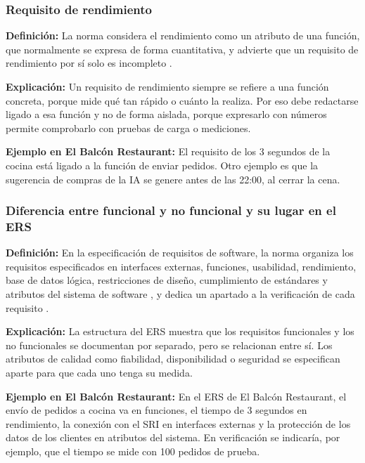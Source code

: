 \subsubsection{Requisito de rendimiento}

\textbf{Definición:} La norma considera el rendimiento como un atributo de una función, que normalmente se expresa de forma cuantitativa, y advierte que un requisito de rendimiento por sí solo es incompleto \cite[\nopp cl.~5.2.8.3]{ieee29148}.

\textbf{Explicación:} Un requisito de rendimiento siempre se refiere a una función concreta, porque mide qué tan rápido o cuánto la realiza. Por eso debe redactarse ligado a esa función y no de forma aislada, porque expresarlo con números permite comprobarlo con pruebas de carga o mediciones.

\textbf{Ejemplo en El Balcón Restaurant:} El requisito de los 3 segundos de la cocina está ligado a la función de enviar pedidos. Otro ejemplo es que la sugerencia de compras de la IA se genere antes de las 22:00, al cerrar la cena.

\subsubsection{Diferencia entre funcional y no funcional y su lugar en el ERS}

\textbf{Definición:} En la especificación de requisitos de software, la norma organiza los requisitos especificados en interfaces externas, funciones, usabilidad, rendimiento, base de datos lógica, restricciones de diseño, cumplimiento de estándares y atributos del sistema de software \cite[\nopp cl.~9.6.10–9.6.18]{ieee29148}, y dedica un apartado a la verificación de cada requisito \cite[\nopp cl.~9.6.19]{ieee29148}.

\textbf{Explicación:} La estructura del ERS muestra que los requisitos funcionales y los no funcionales se documentan por separado, pero se relacionan entre sí. Los atributos de calidad como fiabilidad, disponibilidad o seguridad se especifican aparte para que cada uno tenga su medida.

\textbf{Ejemplo en El Balcón Restaurant:} En el ERS de El Balcón Restaurant, el envío de pedidos a cocina va en funciones, el tiempo de 3 segundos en rendimiento, la conexión con el SRI en interfaces externas y la protección de los datos de los clientes en atributos del sistema. En verificación se indicaría, por ejemplo, que el tiempo se mide con 100 pedidos de prueba.
